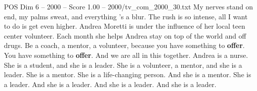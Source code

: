 \begin{textsample}{POS Dim 6 – 2000 – Score 1.00 – 2000/tv\_com\_2000\_30.txt}  \label{ex:f6_pos_089}
My nerves stand on end, my palms sweat, and everything 's a blur.
The rush is so intense, all I want to do is get even higher.
Andrea Moretti is under the influence of her local teen center volunteer.
Each month she helps Andrea stay on top of the world and off drugs.
Be a coach, a mentor, a volunteer, because you have something to \textbf{offer}.
You have something to \textbf{offer}.
And we are all in this together.
Andrea is a nurse.
She is a student, and she is a leader.
She is a volunteer, a mentor, and she is a leader.
She is a mentor.
She is a life-changing person.
And she is a mentor.
She is a leader.
And she is a leader.
And she is a leader.
And she is a leader.

\end{textsample}
